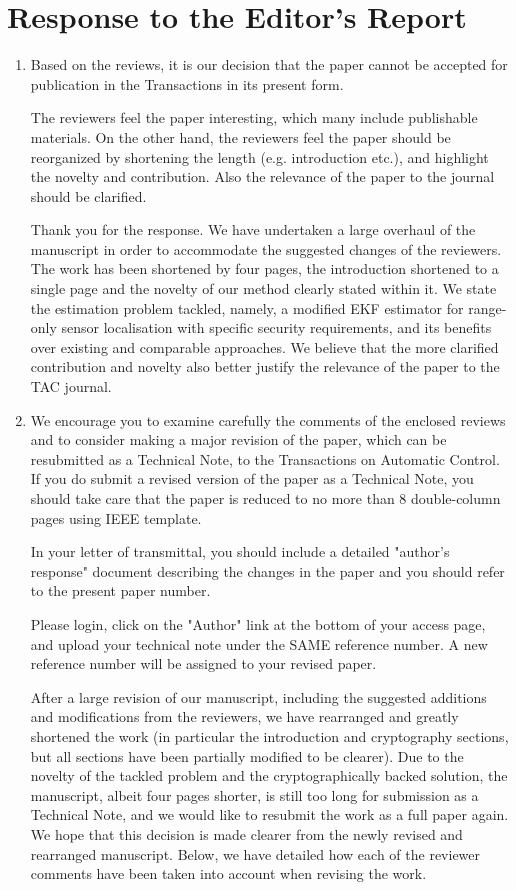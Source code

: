 \documentclass[a4paper]{scrartcl}
\newenvironment{rebuttal}{\begin{enumerate}[label={\color{grey}\thesection.\arabic{enumi}},leftmargin=0pt,ref=\thesection.\arabic{enumi}]}{\end{enumerate}}
\newcommand{\reviewtext}[1]{{\color{nblue} #1}}
\begin{document}
\section*{Response to the Editor's Report}
\def\thesection{E}
\begin{rebuttal} %
\item \reviewtext{Based on the reviews, it is our decision that the paper cannot be accepted for publication in the Transactions in its present form.

The reviewers feel the paper interesting, which many include publishable materials. On the other hand, the reviewers feel the paper should be reorganized by shortening the length (e.g. introduction etc.), and highlight the novelty and contribution. Also the relevance of the paper to the journal should be clarified.}

Thank you for the response. We have undertaken a large overhaul of the manuscript in order to accommodate the suggested changes of the reviewers. The work has been shortened by four pages, the introduction shortened to a single page and the novelty of our method clearly stated within it. We state the estimation problem tackled, namely, a modified EKF estimator for range-only sensor localisation with specific security requirements, and its benefits over existing and comparable approaches. We believe that the more clarified contribution and novelty also better justify the relevance of the paper to the TAC journal.

\item \reviewtext{We encourage you to examine carefully the comments of the enclosed reviews and to consider making a major revision of the paper, which can be resubmitted as a Technical Note, to the Transactions on Automatic Control.  If you do submit a revised version of the paper as a Technical Note, you should take care that the paper is reduced to no
more than 8 double-column pages using IEEE template.

In your letter of transmittal, you should include a detailed "author's response" document describing the changes in the paper and you should refer to the present paper number.

Please login, click on the "Author" link at the bottom of your access page, and upload your technical note under the SAME reference number. A new reference number will be assigned to your revised paper.}

After a large revision of our manuscript, including the suggested additions and modifications from the reviewers, we have rearranged and greatly shortened the work (in particular the introduction and cryptography sections, but all sections have been partially modified to be clearer). Due to the novelty of the tackled problem and the cryptographically backed solution, the manuscript, albeit four pages shorter, is still too long for submission as a Technical Note, and we would like to resubmit the work as a full paper again. We hope that this decision is made clearer from the newly revised and rearranged manuscript. Below, we have detailed how each of the reviewer comments have been taken into account when revising the work.

\end{rebuttal}
\end{document}
